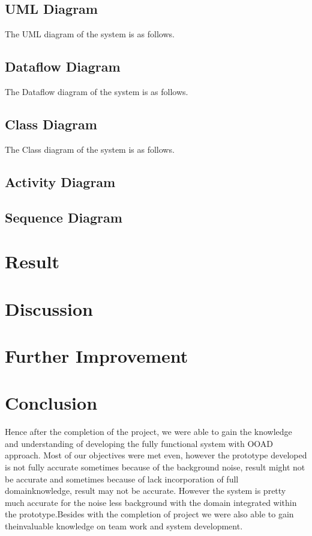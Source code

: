 \documentclass[a4paper,12pt,onepage]{article}
\begin{document}
\subsection{UML Diagram}
The UML diagram of the system is as follows.

\newpage
\subsection{Dataflow Diagram}
The Dataflow diagram of the system is as follows.

\newpage
\subsection{Class Diagram}\par
The Class diagram of the system is as follows.

\newpage
\subsection{Activity Diagram}
\newpage
\subsection{Sequence Diagram}
\newpage

\section{Result}
\newpage
\section{Discussion}

\newpage
\section{Further Improvement}

\newpage
\section{Conclusion}
Hence after the completion of the project, we were able to gain the knowledge and understanding of developing the fully functional system with OOAD approach. Most of our objectives were met even, however the prototype developed is not fully accurate sometimes because of the background noise, result might not be accurate and sometimes because of lack incorporation of full domainknowledge, result may not be accurate. However the system is pretty much accurate for the noise less background with the domain integrated within the prototype.Besides with the completion of project we were also able to gain theinvaluable knowledge on team work and system development.
\newpage


\nocite{*}
\end{document}
